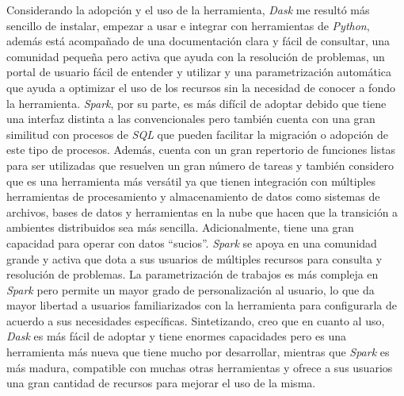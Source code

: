 Considerando la adopción y el uso de la herramienta, \textit{Dask} me resultó más sencillo de instalar, empezar a usar e integrar con herramientas de \textit{Python}, además está acompañado de una documentación clara y fácil de consultar, una comunidad pequeña pero activa que ayuda con la resolución de problemas, un portal de usuario fácil de entender y utilizar y una parametrización automática que ayuda a optimizar el uso de los recursos sin la necesidad de conocer a fondo la herramienta. \textit{Spark}, por su parte, es más difícil de adoptar debido que tiene una interfaz distinta a las convencionales pero también cuenta con una gran similitud con procesos de \textit{SQL} que pueden facilitar la migración o adopción de este tipo de procesos. Además, cuenta con un gran repertorio de funciones listas para ser utilizadas que resuelven un gran número de tareas y también considero que es una herramienta más versátil ya que tienen integración con múltiples herramientas de procesamiento y almacenamiento de datos como sistemas de archivos, bases de datos y herramientas en la nube que hacen que la transición a ambientes distribuidos sea más sencilla. Adicionalmente, tiene una gran capacidad para operar con datos ``sucios''. \textit{Spark} se apoya en una comunidad grande y activa que dota a sus usuarios de múltiples recursos para consulta y resolución de problemas. La parametrización de trabajos es más compleja en \textit{Spark} pero permite un mayor grado de personalización al usuario, lo que da mayor libertad a usuarios familiarizados con la herramienta para configurarla de acuerdo a sus necesidades específicas. Sintetizando, creo que en cuanto al uso, \textit{Dask} es más fácil de adoptar y tiene enormes capacidades pero es una herramienta más nueva que tiene mucho por desarrollar, mientras que \textit{Spark} es más madura, compatible con muchas otras herramientas y ofrece a sus usuarios una gran cantidad de recursos para mejorar el uso de la misma.

